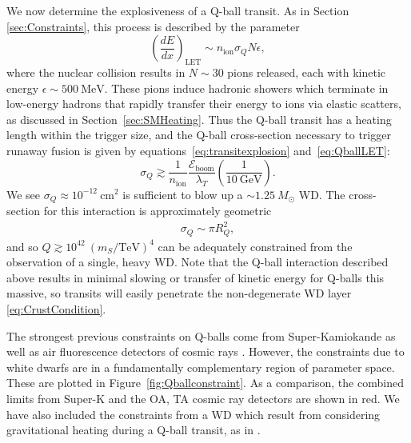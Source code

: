 \documentclass[twocolumn, preprintnumbers,amsmath,amssymb,prd, superscriptaddress]{revtex4}
\newcommand{\Eboom}{\mathcal{E}_\text{boom}}
\newcommand{\GeV}{\text{GeV}}
\def\r{\right)}
\def\l{\left(}
\begin{document}
We now determine the explosiveness of a Q-ball transit.
As in Section \ref{sec:Constraints}, this process is described by the parameter
\begin{equation}
\label{eq:QballLET}
\l\frac{dE}{dx}\r_\text{LET} \sim n_\text{ion} \sigma_Q N \epsilon,
\end{equation}
where the nuclear collision results in $N \sim 30$ pions released, each with kinetic energy $\epsilon \sim 500 ~\text{MeV}$.
These pions induce hadronic showers which terminate in low-energy hadrons that rapidly transfer their energy to ions via elastic scatters, as discussed in Section~\ref{sec:SMHeating}.
Thus the Q-ball transit has a heating length within the trigger size, and the Q-ball cross-section necessary to trigger runaway fusion is given by equations~\eqref{eq:transitexplosion} and~\eqref{eq:QballLET}:
\begin{equation}
 \sigma_Q \gtrsim \frac{1}{n_\text{ion}} \frac{\Eboom}{\lambda_T} 
 \l \frac{1}{10~\GeV} \r.
\end{equation}
We see $\sigma_Q \approx 10^{-12} ~\text{cm}^2$ is sufficient to blow up a $\sim 1.25 ~M_{\odot}$ WD.
The cross-section for this interaction is approximately geometric
\begin{align}
\sigma_Q \sim \pi R_Q^2,
\end{align}
and so $Q \gtrsim 10^{42} ~(m_S/\text{TeV})^4$ can be adequately constrained from the observation of a single, heavy WD.
Note that the Q-ball interaction described above results in minimal slowing or transfer of kinetic energy for Q-balls this massive, so transits will easily penetrate the non-degenerate WD layer \eqref{eq:CrustCondition}.

The strongest previous constraints on Q-balls come from Super-Kamiokande as well as air fluorescence detectors of cosmic rays \cite{Dine:2003ax}.
However, the constraints due to white dwarfs are in a fundamentally complementary region of parameter space.
These are plotted in Figure~\ref{fig:Qballconstraint}.
As a comparison, the combined limits from Super-K and the OA, TA cosmic ray detectors are shown in red.
We have also included the constraints from a WD which result from considering gravitational heating during a Q-ball transit, as in \cite{Graham:2015apa}.
\end{document}
